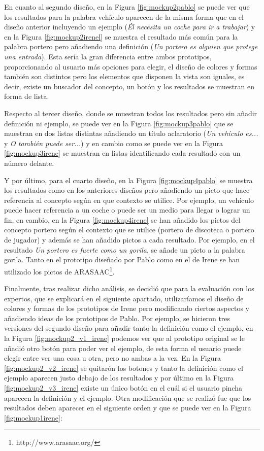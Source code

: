 En cuanto al segundo diseño, en la Figura \ref{fig:mockup2pablo} se puede ver que los resultados para la palabra vehículo aparecen de la misma forma que en el diseño anterior incluyendo un ejemplo (\textit{Él necesita un coche para ir a trabajar}) y en la Figura \ref{fig:mockup2irenel} se muestra el resultado más común para la palabra portero pero añadiendo una definición (\textit{Un portero es alguien que protege una entrada}). Esta sería la gran diferencia entre ambos prototipos, proporcionando al usuario más opciones para elegir, el diseño de colores y formas también son distintos pero los elementos que disponen la vista son iguales, es decir, existe un buscador del concepto, un botón y los resultados se muestran en forma de lista.

Respecto al tercer diseño, donde se muestran todos los resultados pero sin añadir definición ni ejemplo, se puede ver en la Figura \ref{fig:mockup3pablo} que se muestran en dos listas distintas añadiendo un título aclaratorio (\textit{Un vehículo es...} y \textit{O también puede ser...}) y en cambio como se puede ver en la Figura \ref{fig:mockup3irene} se muestran en listas identificando cada resultado con un número delante.

Y por último, para el cuarto diseño, en la Figura \ref{fig:mockup4pablo} se muestra los resultados como en los anteriores diseños pero añadiendo un picto que hace referencia al concepto según en que contexto se utilice. Por ejemplo, un vehículo puede hacer referencia a un coche o puede ser un medio para llegar o lograr un fin, en cambio, en la Figura \ref{fig:mockup4irene} se han añadido los pictos del concepto portero según el contexto que se utilice (portero de discoteca o portero de jugador) y además se han añadido pictos a cada resultado. Por ejemplo, en el resultado \textit{Un portero es fuerte como un gorila}, se añade un picto a la palabra gorila. 
Tanto en el prototipo diseñado por Pablo como en el de Irene se han utilizado los pictos de ARASAAC\footnote{http://www.arasaac.org/}.

Finalmente, tras realizar dicho análisis, se decidió que para la evaluación con los expertos, que se explicará en el siguiente apartado, utilizaríamos el diseño de colores y formas de los prototipos de Irene pero modificando ciertos aspectos y añadiendo ideas de los prototipos de Pablo. Por ejemplo, se hicieron tres versiones del segundo diseño para añadir tanto la definición como el ejemplo, en la Figura \ref{fig:mockup2_v1_irene} podemos ver que al prototipo original se le añadió otro botón para poder ver el ejemplo, de esta forma el usuario puede elegir entre ver una cosa u otra, pero no ambas a la vez. En la Figura \ref{fig:mockup2_v2_irene} se quitarón los botones y tanto la definición como el ejemplo aparecen justo debajo de los resultados y por último en la Figura \ref{fig:mockup2_v3_irene} existe un único botón en el cuál si el usuario pincha aparecen la definición y el ejemplo.
Otra modificación que se realizó fue que los resultados deben aparecer en el siguiente orden y que se puede ver en la Figura \ref{fig:mockup1irene}:

